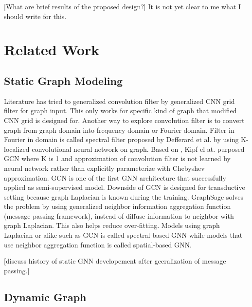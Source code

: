 \documentclass{IEEEtran}
\begin{document}
[What are brief results of the proposed design?] It is not yet clear to me what I should write for this.

\section{Related Work}
\label{sec:orgc5217f3}
\subsection{Static Graph Modeling}
\label{sec:orgbdf3ae1}

Literature has tried to generalized convolution filter by generalized CNN grid filter for graph input. This only works for specific kind of graph that modified CNN grid is designed for. Another way to explore convolution filter is to convert graph from graph domain into frequency domain or Fourier domain. Filter in Fourier in domain is called spectral filter proposed by Defferard et al. \cite{defferrard2016convolutional} by using K-localized convolutional neural network on graph. Based on \cite{defferrard2016convolutional}, Kipf el at. \cite{kipf2016semi} purposed GCN where K is 1 and approximation of convolution filter is not learned by neural network rather than explicitly parameterize with Chebyshev approximation. GCN is one of the first GNN architecture that successfully applied as semi-supervised model. Downside of GCN is designed for transductive setting because graph Laplacian is known during the training. GraphSage \cite{hamilton2017inductive} solves the problem by using generalized neighbor information aggregation function (message passing framework), instead of diffuse information to neighbor with graph Laplacian. This also helps reduce over-fitting. Models using graph Laplacian or alike such as GCN is called spectral-based GNN while models that use neighbor aggregation function is called spatial-based GNN.

[discuss history of static GNN developement after geeralization of message passing.]

\subsection{Dynamic Graph}
\label{sec:orgad7bd75}
\end{document}
